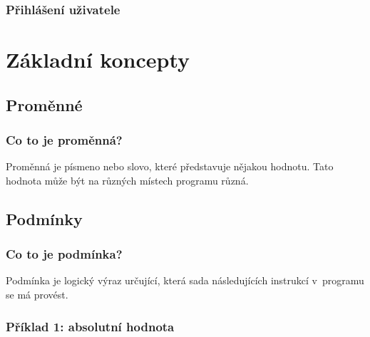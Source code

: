 \documentclass[aspectratio=169,11pt]{beamer}
\begin{document}
\begin{frame}
 \frametitle{Přihlášení uživatele}
 \centering
 \begin{minipage}{.8\textwidth}
 \end{minipage}
\end{frame}

\section[Základní koncepty]{Základní koncepty}
\subsection[Proměnné]{Proměnné}

\begin{frame}
 \frametitle{Co to je proměnná?}
 \begin{tcolorbox}[title=Proměnná,center,width=.9\textwidth]
  Proměnná je písmeno nebo slovo, které \alert{představuje nějakou hodnotu}.
  Tato hodnota může být na různých místech programu různá.
 \end{tcolorbox}
\end{frame}

\subsection[Podmínky]{Podmínky}

\begin{frame}
 \frametitle{Co to je podmínka?}
 \begin{tcolorbox}[title=Podmínka,center,width=.9\textwidth]
  Podmínka je \alert{logický výraz} určující, která sada následujících instrukcí
  v~programu se má provést.
 \end{tcolorbox}
\end{frame}

\begin{frame}
 \frametitle{Příklad 1: absolutní hodnota}
 \centering
 \begin{minipage}{.8\textwidth}
  \begin{algorithm}[H]
   \DontPrintSemicolon
   \BlankLine

  \end{algorithm}
 \end{minipage}
\end{frame}
\end{document}
